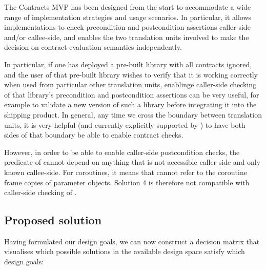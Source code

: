 The Contracts MVP has been designed from the start to accommodate a wide range of implementation strategies and usage scenarios. In particular, it allows implementations to check precondition and postcondition assertions caller-side and/or callee-side, and enables the two translation units involved to make the decision on contract evaluation semantics independently.

In particular, if one has deployed a pre-built library with all contracts ignored, and the user of that pre-built library wishes to verify that it is working correctly when used from particular other translation units, enablinge caller-side checking of that library's precondition and postcondition assertions can be very useful, for example to validate a new version of such a library before integrating it into the shipping product. In general, any time we cross the boundary between translation units, it is very helpful (and currently explicitly supported by \cite{P2900R8}) to have both sides of that boundary be able to enable contract checks.

However, in order to be able to enable caller-side postcondition checks, the predicate of  cannot depend on anything that is not accessible caller-side and only known callee-side. For coroutines, it means that  cannot refer to the coroutine frame copies of parameter objects. Solution 4 is therefore not compatible with caller-side checking of .


\subsection{Proposed solution}

Having formulated our design goals, we can now construct a decision matrix that visualises which possible solutions in the available design space satisfy which design goals:


